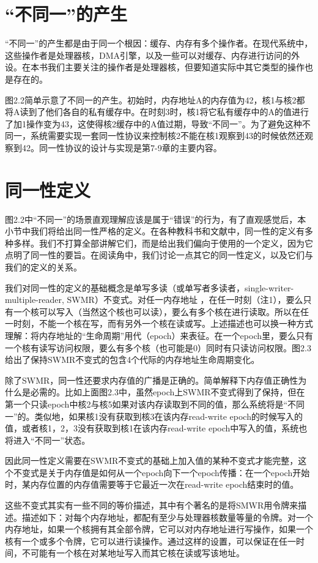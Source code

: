 \documentclass[UTF-8]{ctexrep}
\begin{document}
\section{“不同一”的产生}
“不同一”的产生都是由于同一个根因：缓存、内存有多个操作者。在现代系统中，这些操作者是处理器核，DMA引擎，以及一些可以对缓存、内存进行访问的外设。在本书我们主要关注的操作者是处理器核，但要知道实际中其它类型的操作也是存在的。
\par 图2.2简单示意了不同一的产生。初始时，内存地址A的内存值为42，核1与核2都将A读到了他们各自的私有缓存中。在时刻3时，核1将它私有缓存中的A的值进行了加1操作变为43，这使得核2缓存中的A值过期，导致“不同一”。为了避免这种不同一，系统需要实现一套同一性协议来控制核2不能在核1观察到43的时候依然还观察到42。同一性协议的设计与实现是第7-9章的主要内容。
\section{同一性定义}
图2.2中“不同一”的场景直观理解应该是属于“错误”的行为，有了直观感觉后，本小节中我们将给出同一性严格的定义。在各种教科书和文献中，同一性的定义有多种多样。我们不打算全部讲解它们，而是给出我们偏向于使用的一个定义，因为它点明了同一性的要旨。在阅读角中，我们讨论一点其它的同一性定义，以及它们与我们的定义的关系。
\par 我们对同一性的定义的基础概念是单写多读（或单写者多读者，single-writer-multiple-reader, SWMR）不变式。对任一内存地址 ，在任一时刻（注1），要么只有一个核可以写入（当然这个核也可以读），要么有多个核在进行读取。所以在任一时刻，不能一个核在写，而有另外一个核在读或写。上述描述也可以换一种方式理解：将内存地址的“生命周期”用代（epoch）来表征。在一个epoch里，要么只有一个核有读写访问权限，要么有多个核（也可能是0）同时有只读访问权限。图2.3给出了保持SWMR不变式的包含4个代际的内存地址生命周期变化。
\par 除了SWMR，同一性还要求内存值的广播是正确的。简单解释下内存值正确性为什么是必需的。比如上面图2.3中，虽然epoch上SWMR不变式得到了保持，但在第一个只读epoch中核2与核5如果对该内存读取到不同的值，那么系统将是“不同一”的。类似地，如果核1没有获取到核3在该内存read-write epoch的时候写入的值，或者核1，2，3没有获取到核1在该内存read-write epoch中写入的值，系统也将进入“不同一”状态。
\par 因此同一性定义需要在SWMR不变式的基础上加入值的某种不变式才能完整，这个不变式是关于内存值是如何从一个epoch向下一个epoch传播：在一个epoch开始时，某内存位置的内存值需要等于它最近一次在read-write epoch结束时的值。
\par 这些不变式其实有一些不同的等价描述，其中有个著名的是将SMWR用令牌来描述。描述如下：对每个内存地址，都配有至少与处理器核数量等量的令牌。对一个内存地址，如果一个核拥有其全部令牌，它可以对内存地址进行写操作，如果一个核有一个或多个令牌，它可以进行读操作。通过这样的设置，可以保证在任一时间，不可能有一个核在对某地址写入而其它核在读或写该地址。
\end{document}
